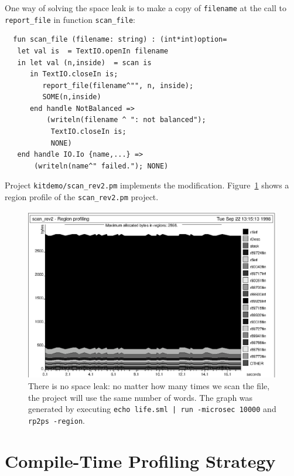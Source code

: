 \documentclass[12pt]{book}
\begin{document}
One way of solving the space leak is to make a copy of {\tt filename}
at the call to {\tt report\_file} in function {\tt scan\_file}:
\begin{verbatim}
  fun scan_file (filename: string) : (int*int)option=
   let val is  = TextIO.openIn filename 
   in let val (n,inside)  = scan is
      in TextIO.closeIn is; 
         report_file(filename^"", n, inside);
         SOME(n,inside)
      end handle NotBalanced => 
          (writeln(filename ^ ": not balanced");
           TextIO.closeIn is;
           NONE)
   end handle IO.Io {name,...} => 
       (writeln(name^" failed."); NONE)
\end{verbatim}
Project 
%
{\tt kitdemo/scan\_rev2.pm} implements the modification.
Figure~\ref{scan_rev2_1.fig} shows a region profile of the
\texttt{scan\_rev2.pm} project.
\begin{figure}
\begin{center}
\includegraphics{scan_rev2_1.ps}
\end{center}
\caption{There is no space leak: no matter how many times we scan the
  file, the project will use the same number of words. The graph was
  generated by executing \texttt{echo life.sml | run -microsec 10000} and \texttt{rp2ps
    -region}.}
\label{scan_rev2_1.fig}
\end{figure}

\section{Compile-Time Profiling Strategy}
\end{document}
